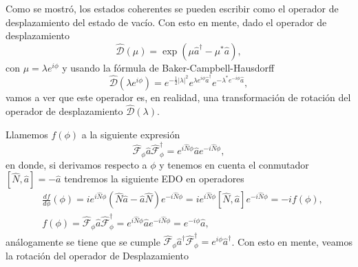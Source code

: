                 Como se mostró, los estados coherentes se pueden escribir como el operador de desplazamiento del estado de vacío. Con esto en mente, dado el operador de desplazamiento
                \begin{equation*}
                    \hat{\mathcal{D}}(\mu) = \exp\left(\mu \hat{a}^\dagger - \mu^* \hat{a} \right),
                \end{equation*}
                con $\mu = \lambda e^{i\phi}$ y usando la fórmula de Baker-Campbell-Hausdorff \cite{sakurai1995modern,cahill1969ordered}
                \begin{equation}
                    \hat{\mathcal{D}}\left(\lambda e^{i\phi} \right) = e^{-\frac{1}{2}|\lambda|^2} e^{\lambda e^{i\phi} \hat{a}^\dagger}e^{-\lambda^* e^{-i\phi} \hat{a}},
                \end{equation}
                vamos a ver que este operador es, en realidad, una transformación de rotación del operador de desplazamiento $\hat{\mathcal{D}}(\lambda)$. 

                Llamemos $f(\phi)$ a la siguiente expresión
                \begin{equation*}
                    \hat{\mathcal{F}}_\phi \hat{a}\hat{\mathcal{F}}_\phi^\dagger = e^{i\hat{N}\phi} \hat{a}e^{-i\hat{N}\phi},
                \end{equation*}
                en donde, si derivamos respecto a $\phi$ y tenemos en cuenta el conmutador $\left[\hat{N}, \hat{a}\right] = - \hat{a}$ tendremos la siguiente EDO en operadores
                \begin{align*}
                    & \frac{d f}{d\phi}(\phi) = ie^{i\hat{N}\phi}\left(\hat{N}\hat{a} - \hat{a}\hat{N} \right)e^{-i\hat{N}\phi} = ie^{i\hat{N}\phi}\left[\hat{N},\hat{a} \right]e^{-i\hat{N}\phi} = -if(\phi),\\
                    & f(\phi) = \hat{\mathcal{F}}_\phi \hat{a}\hat{\mathcal{F}}_\phi^\dagger = e^{i\hat{N}\phi} \hat{a}e^{-i\hat{N}\phi} = e^{-i\phi}\hat{a},
                \end{align*}
                análogamente se tiene que se cumple $\hat{\mathcal{F}}_\phi \hat{a}^\dagger\hat{\mathcal{F}}_\phi^\dagger = e^{i\phi}\hat{a}^\dagger$. Con esto en mente, veamos la rotación del operador de Desplazamiento

